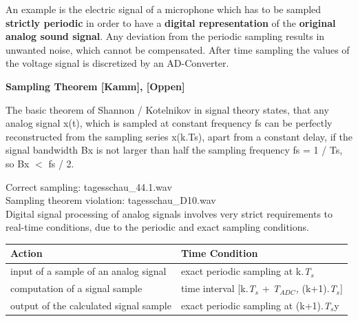 An example is the electric signal of a microphone which has to be sampled \textbf{strictly periodic} in order to have a \textbf{digital representation} of the \textbf{original analog sound signal}. Any deviation from the periodic sampling results in unwanted noise, which cannot be compensated. After time sampling the values of the voltage signal is discretized by an AD-Converter.\\
\nsl{\newpage}

{\rot\bf Sampling Theorem [Kamm], [Oppen]}

\begin{tcolorbox}[colback=blue!5!white,colframe=blue!75!black]
  The basic theorem of Shannon / Kotelnikov in signal theory states, that any analog signal x(t), which is sampled at constant frequency fs can be perfectly reconstructed from the sampling series x(k.Ts), apart from a constant delay, if the signal bandwidth Bx is not larger than half the sampling frequency fs = 1 / Ts, so Bx $<$ fs / 2.
\end{tcolorbox}


Correct sampling:       tagesschau\_44.1.wav \\
Sampling theorem violation:  tagesschau\_D10.wav\\

Digital signal processing of analog signals involves very strict requirements to real-time conditions, due to the periodic and exact sampling conditions.\\


\begin{table}[h!]
\setlength{\tabcolsep}{10pt} %
\renewcommand{\arraystretch}{1.5} %
\centering
 \begin{tabular}{|l|l|} 
 \hline
 \textbf{Action} & \textbf{Time Condition} \\ [0.1ex] 
 \hline
 input of a sample of an analog signal & exact periodic sampling at  k.\textit{T}${}_{s}$ \\ 
 \hline
 computation of a signal sample & time interval [k.\textit{T}${}_{s}$ + \textit{T${}_{ADC}$,} (k+1).\textit{T}${}_{s}$] \\ 
  \hline
 output of the calculated signal sample & exact periodic sampling at  (k+1).\textit{T}${}_{s}$y  \\ 
 \hline
 \end{tabular}
\end{table}

